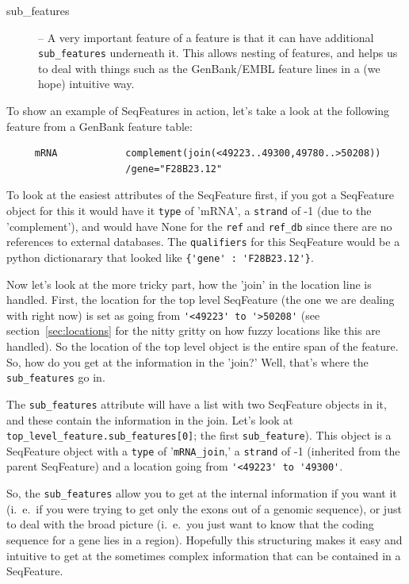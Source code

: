 \documentclass{report}
\begin{document}
\begin{description}
  \item[sub\_features] -- A very important feature of a feature is that it can have additional \verb|sub_features| underneath it. This allows nesting of features, and helps us to deal with things such as the GenBank/EMBL feature lines in a (we hope) intuitive way.
\end{description}

To show an example of SeqFeatures in action, let's take a look at the following feature from a GenBank feature table:

\begin{verbatim}
     mRNA            complement(join(<49223..49300,49780..>50208))
                     /gene="F28B23.12"
\end{verbatim}

To look at the easiest attributes of the SeqFeature first, if you got a SeqFeature object for this it would have it \verb|type| of 'mRNA', a \verb|strand| of -1 (due to the 'complement'), and would have None for the \verb|ref| and \verb|ref_db| since there are no references to external databases. The \verb|qualifiers| for this SeqFeature would be a python dictionarary that looked like \verb|{'gene' : 'F28B23.12'}|.


Now let's look at the more tricky part, how the 'join' in the location 
line is handled. First, the location for the top level SeqFeature (the 
one we are dealing with right now) is set as going from 
\verb|'<49223' to '>50208'| (see section~\ref{sec:locations} for 
the nitty gritty on how fuzzy locations like this are handled). 
So the location of the top level object is the entire span of the 
feature. So, how do you get at the information in the 'join?' 
Well, that's where the \verb|sub_features| go in.


The \verb|sub_features| attribute will have a list with two SeqFeature 
objects in it, and these contain the information in the join. Let's 
look at \verb|top_level_feature.sub_features[0]|; the first 
\verb|sub_feature|). This object is a SeqFeature object with a 
\verb|type| of '\verb|mRNA_join|,' a \verb|strand| of -1 (inherited 
from the parent SeqFeature) and a location going from 
\verb|'<49223' to '49300'|. 


So, the \verb|sub_features| allow you to get at the internal information if you want it (i.~e.~if you were trying to get only the exons out of a genomic sequence), or just to deal with the broad picture (i.~e.~you just want to know that the coding sequence for a gene lies in a region). Hopefully this structuring makes it easy and intuitive to get at the sometimes complex information that can be contained in a SeqFeature.
\end{document}
